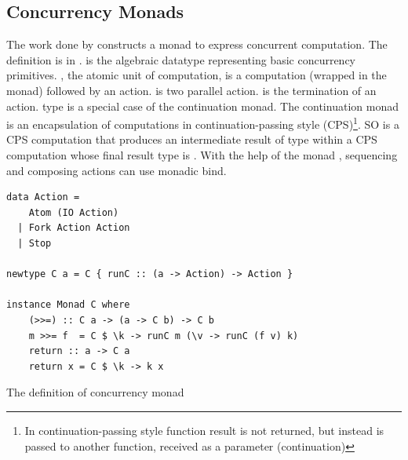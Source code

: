 \subsection{Concurrency Monads}
The work done by \cite{claessenPoorManConcurrency1999} constructs a monad to express concurrent computation. The definition is in .  is the algebraic datatype representing basic concurrency primitives. , the atomic unit of computation, is a computation (wrapped in the  monad) followed by an action.  is two parallel action.  is the termination of an action. type  is a special case of the continuation monad. The continuation monad is an encapsulation of computations in continuation-passing style (CPS)\footnote{In continuation-passing style function result is not returned, but instead is passed to another function, received as a parameter (continuation)\cite{ControlMonadCont}}. SO  is a CPS computation that produces an intermediate result of type  within a CPS computation whose final result type is . With the help of the monad , sequencing and composing actions can use monadic bind.
\begin{listing}[ht]
  \begin{verbatim}
data Action =
    Atom (IO Action)
  | Fork Action Action
  | Stop

newtype C a = C { runC :: (a -> Action) -> Action }
    
instance Monad C where
    (>>=) :: C a -> (a -> C b) -> C b
    m >>= f  = C $ \k -> runC m (\v -> runC (f v) k)
    return :: a -> C a
    return x = C $ \k -> k x
  \end{verbatim}
  \caption{The definition of concurrency monad}
  \label{b:mo:def}
\end{listing}


